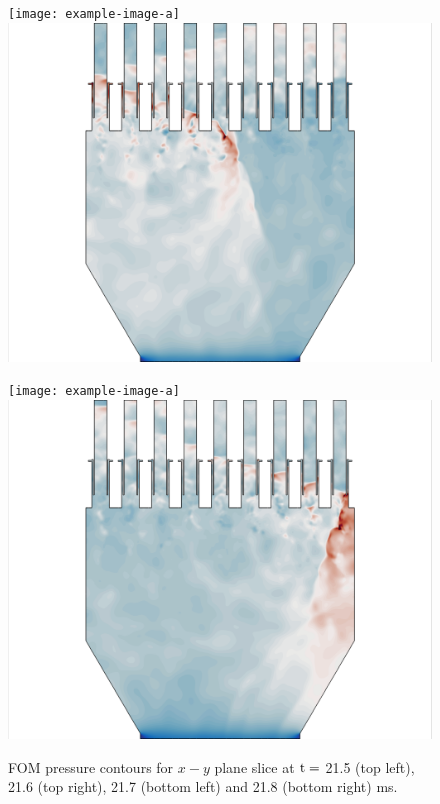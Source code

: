 \begin{figure}
	\begin{minipage}{0.49\linewidth}
		\ifdefined\DRAFT
			\texttt{[image: example-image-a]}
		\else
			\includegraphics[width=0.99\linewidth,trim={0.5em 0em 6cm 0em},clip]{Chapters/HPROMResults/Images/nineElem/example_snaps/example_pressure_z_217000.png}
		\fi
	\end{minipage}
	\begin{minipage}{0.49\linewidth}
		\ifdefined\DRAFT
			\texttt{[image: example-image-a]}
		\else
			\includegraphics[width=0.99\linewidth,trim={6cm 0em 0.5em 0em},clip]{Chapters/HPROMResults/Images/nineElem/example_snaps/example_pressure_z_218000.png}
		\fi
	\end{minipage}
	\caption{\label{fig:nineElemFOMPressure}FOM pressure contours for $x-y$ plane slice at $\text{t} = $ 21.5 (top left), 21.6 (top right), 21.7 (bottom left) and 21.8 (bottom right) ms.}
\end{figure}


